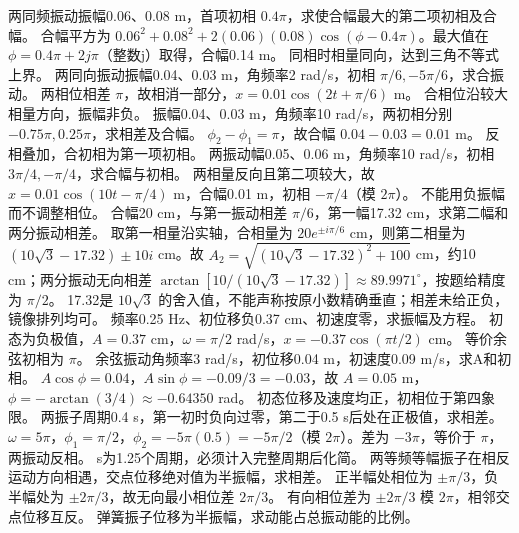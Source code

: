 \problemtext 两同频振动振幅0.06、0.08 m，首项初相 $0.4\pi$，求使合幅最大的第二项初相及合幅。
\workings 合幅平方为 $0.06^2+0.08^2+2(0.06)(0.08)\cos(\phi-0.4\pi)$。最大值在 $\phi=0.4\pi+2j\pi$（整数j）取得，合幅0.14 m。
\crosscheck 同相时相量同向，达到三角不等式上界。
\problemtext 两同向振动振幅0.04、0.03 m，角频率2 rad/s，初相 $\pi/6,-5\pi/6$，求合振动。
\workings 两相位相差 $\pi$，故相消一部分，$x=0.01\cos(2t+\pi/6)$ m。
\crosscheck 合相位沿较大相量方向，振幅非负。
\problemtext 振幅0.04、0.03 m，角频率10 rad/s，两初相分别 $-0.75\pi,0.25\pi$，求相差及合幅。
\workings $\phi_2-\phi_1=\pi$，故合幅 $0.04-0.03=0.01$ m。
\crosscheck 反相叠加，合初相为第一项初相。
\problemtext 两振动幅0.05、0.06 m，角频率10 rad/s，初相 $3\pi/4,-\pi/4$，求合幅与初相。
\workings 两相量反向且第二项较大，故 $x=0.01\cos(10t-\pi/4)$ m，合幅0.01 m，初相 $-\pi/4$（模 $2\pi$）。
\crosscheck 不能用负振幅而不调整相位。
\problemtext 合幅20 cm，与第一振动相差 $\pi/6$，第一幅17.32 cm，求第二幅和两分振动相差。
\workings 取第一相量沿实轴，合相量为 $20e^{\pm i\pi/6}$ cm，则第二相量为 $(10\sqrt3-17.32)\pm10i$ cm。故 $A_2=\sqrt{(10\sqrt3-17.32)^2+100}$ cm，约10 cm；两分振动无向相差 $\arctan[10/(10\sqrt3-17.32)]\approx89.9971^\circ$，按题给精度为 $\pi/2$。
\crosscheck 17.32是 $10\sqrt3$ 的舍入值，不能声称按原小数精确垂直；相差未给正负，镜像排列均可。
\problemtext 频率0.25 Hz、初位移负0.37 cm、初速度零，求振幅及方程。
\workings 初态为负极值，$A=0.37$ cm，$\omega=\pi/2$ rad/s，$x=-0.37\cos(\pi t/2)$ cm。
\crosscheck 等价余弦初相为 $\pi$。
\problemtext 余弦振动角频率3 rad/s，初位移0.04 m，初速度0.09 m/s，求A和初相。
\workings $A\cos\phi=0.04$，$A\sin\phi=-0.09/3=-0.03$，故 $A=0.05$ m，$\phi=-\arctan(3/4)\approx-0.64350$ rad。
\crosscheck 初态位移及速度均正，初相位于第四象限。
\problemtext 两振子周期0.4 s，第一初时负向过零，第二于0.5 s后处在正极值，求相差。
\workings $\omega=5\pi$，$\phi_1=\pi/2$，$\phi_2=-5\pi(0.5)=-5\pi/2$（模 $2\pi$）。差为 $-3\pi$，等价于 $\pi$，两振动反相。
 s为1.25个周期，必须计入完整周期后化简。
\problemtext 两等频等幅振子在相反运动方向相遇，交点位移绝对值为半振幅，求相差。
\workings 正半幅处相位为 $\pm\pi/3$，负半幅处为 $\pm2\pi/3$，故无向最小相位差 $2\pi/3$。
\crosscheck 有向相位差为 $\pm2\pi/3$ 模 $2\pi$，相邻交点位移互反。
\problemtext 弹簧振子位移为半振幅，求动能占总振动能的比例。
